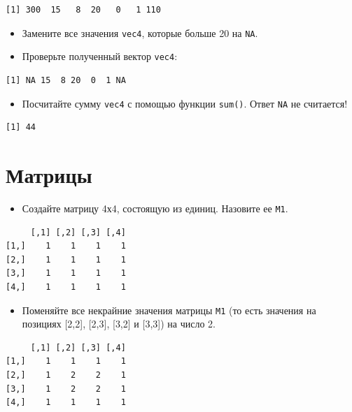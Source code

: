 \documentclass[
]{book}
\providecommand{\tightlist}{%
  \setlength{\itemsep}{0pt}\setlength{\parskip}{0pt}}
\begin{document}
\begin{verbatim}
[1] 300  15   8  20   0   1 110
\end{verbatim}

\begin{itemize}
\item
  Замените все значения \texttt{vec4}, которые больше 20 на \texttt{NA}.
\item
  Проверьте полученный вектор \texttt{vec4}:
\end{itemize}

\begin{verbatim}
[1] NA 15  8 20  0  1 NA
\end{verbatim}

\begin{itemize}
\tightlist
\item
  Посчитайте сумму \texttt{vec4} с помощью функции \texttt{sum()}. Ответ \texttt{NA} не считается!
\end{itemize}

\begin{verbatim}
[1] 44
\end{verbatim}

\hypertarget{task_matrix}{%
\section{Матрицы}\label{task_matrix}}

\begin{itemize}
\tightlist
\item
  Создайте матрицу 4х4, состоящую из единиц. Назовите ее \texttt{M1}.
\end{itemize}

\begin{verbatim}
     [,1] [,2] [,3] [,4]
[1,]    1    1    1    1
[2,]    1    1    1    1
[3,]    1    1    1    1
[4,]    1    1    1    1
\end{verbatim}

\begin{itemize}
\tightlist
\item
  Поменяйте все некрайние значения матрицы \texttt{M1} (то есть значения на позициях {[}2,2{]}, {[}2,3{]}, {[}3,2{]} и {[}3,3{]}) на число 2.
\end{itemize}

\begin{verbatim}
     [,1] [,2] [,3] [,4]
[1,]    1    1    1    1
[2,]    1    2    2    1
[3,]    1    2    2    1
[4,]    1    1    1    1
\end{verbatim}
\end{document}
